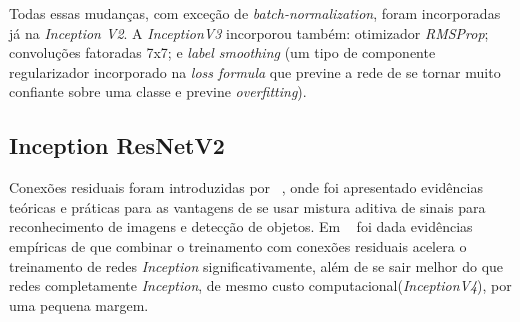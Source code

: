 \documentclass{bmvc2k}
\begin{document}
Todas essas mudanças, com exceção de \textit{batch-normalization}, foram incorporadas já na \textit{Inception V2}. A \textit{InceptionV3} incorporou também: otimizador \textit{RMSProp}; convoluções fatoradas 7x7; e \textit{label smoothing} (um tipo de componente regularizador incorporado na \textit{loss formula} que previne a rede de se tornar muito confiante sobre uma classe e previne \textit{overfitting}).
\subsection{Inception ResNetV2}
Conexões residuais foram introduzidas por ~\cite{deep}, onde foi apresentado evidências teóricas e práticas para as vantagens de se usar mistura aditiva de sinais para reconhecimento de imagens e detecção de objetos. Em ~\cite{szegedy2017inception} foi dada evidências empíricas de que combinar o treinamento com conexões residuais acelera o treinamento de redes \textit{Inception} significativamente, além de se sair melhor do que redes completamente \textit{Inception}, de mesmo custo computacional(\textit{InceptionV4}), por uma pequena margem. 
\end{document}
